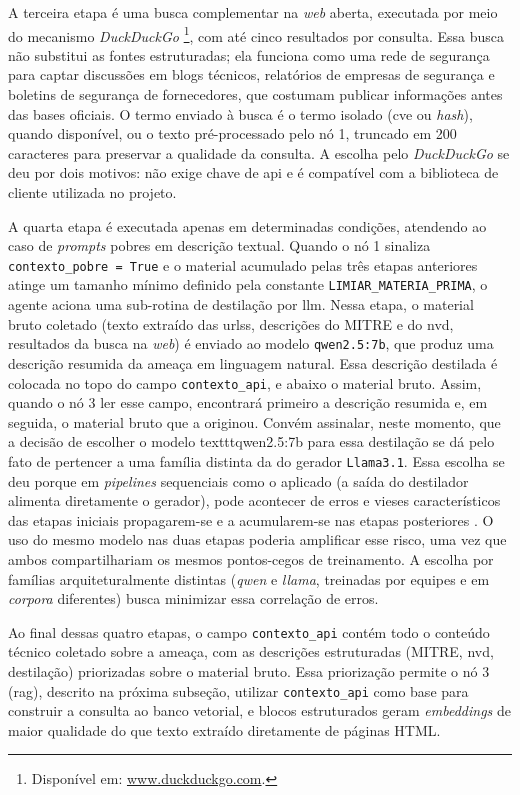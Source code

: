 A terceira etapa é uma busca complementar na \textit{web} aberta, executada por meio do mecanismo \textit{DuckDuckGo}
\footnote{Disponível em: \url{www.duckduckgo.com}.}, 
com até cinco resultados por consulta. 
Essa busca não substitui as fontes estruturadas; ela funciona como uma rede de segurança para captar discussões em blogs técnicos, relatórios de empresas de segurança e boletins de segurança de fornecedores, que costumam publicar informações antes das bases oficiais. 
O termo enviado à busca é o termo isolado (\gls{cve} ou \textit{hash}), quando disponível, ou o texto pré-processado pelo nó 1, truncado em 200 caracteres para preservar a qualidade da consulta.
A escolha pelo \textit{DuckDuckGo} se deu por dois motivos: não exige chave de \gls{api} e é compatível com a biblioteca de cliente utilizada no projeto.

A quarta etapa é executada apenas em determinadas condições, atendendo ao caso de \textit{prompts} pobres em descrição textual. 
Quando o nó 1 sinaliza \texttt{contexto\_pobre = True} e o material acumulado pelas três etapas anteriores atinge um tamanho mínimo definido pela constante \texttt{LIMIAR\_MATERIA\_PRIMA}, o agente aciona uma sub-rotina de destilação por \gls{llm}.
Nessa etapa, o material bruto coletado (texto extraído das \gls{url}ss, descrições do MITRE e do \gls{nvd}, resultados da busca na \textit{web}) é enviado ao modelo \texttt{qwen2.5:7b}, que produz uma descrição resumida da ameaça em linguagem natural. 
Essa descrição destilada é colocada no topo do campo \texttt{contexto\_api}, e abaixo o material bruto. 
Assim, quando o nó 3 ler esse campo, encontrará primeiro a descrição resumida e, em seguida, o material bruto que a originou.
Convém assinalar, neste momento, que a decisão de escolher o modelo texttt{qwen2.5:7b} para essa destilação se dá pelo fato de pertencer a uma família distinta da do gerador \texttt{Llama3.1}.
Essa escolha se deu porque em \textit{pipelines} sequenciais como o aplicado (a saída do destilador alimenta diretamente o gerador), pode acontecer de erros e vieses característicos das etapas iniciais propagarem-se e a acumularem-se nas etapas posteriores \cite{caselli2015piling}. 
O uso do mesmo modelo nas duas etapas poderia amplificar esse risco, uma vez que ambos compartilhariam os mesmos pontos-cegos de treinamento. 
A escolha por famílias arquiteturalmente distintas (\textit{qwen} e \textit{llama}, treinadas por equipes e em \textit{corpora} diferentes) busca minimizar essa correlação de erros.

Ao final dessas quatro etapas, o campo \texttt{contexto\_api} contém todo o conteúdo técnico coletado sobre a ameaça, com as descrições estruturadas (MITRE, \gls{nvd}, destilação) priorizadas sobre o material bruto. 
Essa priorização permite o nó 3 (\gls{rag}), descrito na próxima subseção, utilizar \texttt{contexto\_api} como base para construir a consulta ao banco vetorial, e blocos estruturados geram \textit{embeddings} de maior qualidade do que texto extraído diretamente de páginas HTML.

